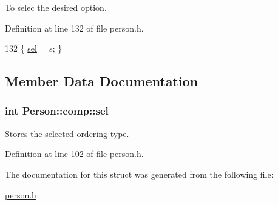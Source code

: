 To selec the desired option. 



Definition at line 132 of file person.\+h.


\begin{DoxyCode}
132 \{ \hyperlink{struct_person_1_1comp_a85555416f9f001302f50825aa149ced3}{sel} = s; \}
\end{DoxyCode}


\subsection{Member Data Documentation}
\hypertarget{struct_person_1_1comp_a85555416f9f001302f50825aa149ced3}{
\subsubsection[{sel}]{\setlength{\rightskip}{0pt plus 5cm}int Person\+::comp\+::sel}}\label{struct_person_1_1comp_a85555416f9f001302f50825aa149ced3}


Stores the selected ordering type. 



Definition at line 102 of file person.\+h.



The documentation for this struct was generated from the following file\+:\begin{DoxyCompactItemize}
\item 
\hyperlink{person_8h}{person.\+h}\end{DoxyCompactItemize}
